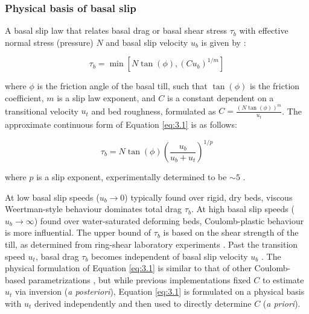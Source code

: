 \subsubsection{Physical basis of basal slip}

A basal slip law that relates basal drag or basal shear stress $\tau_b$ with effective normal stress (pressure) $N$ and basal slip velocity $u_b$ is given by \citet[][eq.1]{Zoetsliplawglaciers2020}:

\begin{equation}
  \tau_b = \min [ N \tan(\phi), (C u_b)^{1/m} ] \label{eq:3.1}
\end{equation}

where $\phi$ is the friction angle of the basal till, such that $\tan(\phi)$ is the friction coefficient, $m$ is a slip law exponent, and $C$ is a constant dependent on a transitional velocity $u_t$ and bed roughness, formulated as $C = \frac{(N \tan(\phi))^{m}}{u_t}$.
The approximate continuous form of Equation \eqref{eq:3.1} \citep[][eq.3]{Zoetsliplawglaciers2020} is as follows:

\begin{equation}
  \tau_b = N \tan(\phi) \left( \frac{u_b}{u_b + u_t} \right)^{1/p} \label{eq:3.2}
\end{equation}

where $p$ is a slip exponent, experimentally determined to be $\sim5$ \citep{Zoetsliplawglaciers2020}.

At low basal slip speeds ($u_b \to 0$) typically found over rigid, dry beds, viscous Weertman-style behaviour \citep[$(C u_b)^{1/m}$ in Eq.~\ref{eq:3.1},][]{WeertmanSlidingGlaciers1957} dominates total drag $\tau_b$.
At high basal slip speeds ($u_b \to \infty$) found over water-saturated deforming beds, Coulomb-plastic behaviour \citep[$N \tan(\phi)$ in Eq.~\ref{eq:3.1}, e.g.][]{Schoofeffectcavitationglacier2005,JoughinRegularizedCoulombFriction2019} is more influential.
The upper bound of $\tau_b$ is based on the shear strength of the till, as determined from ring-shear laboratory experiments \citep{Zoetsliplawglaciers2020}.
Past the transition speed $u_t$, basal drag $\tau_b$ becomes independent of basal slip velocity $u_b$ \citep[c.f.][]{StearnsFrictionbeddoes2018}.
The physical formulation of Equation \eqref{eq:3.1} is similar to that of other Coulomb-based parametrizations \citep[e.g.][]{TsaiMarineicesheetprofiles2015,JoughinRegularizedCoulombFriction2019}, but while previous implementations fixed $C$ to estimate $u_t$ via inversion (\textit{a posteriori}), Equation \eqref{eq:3.1} is formulated on a physical basis with $u_t$ derived independently \citep[using clast size and till placement, see eq.2 in][]{Zoetsliplawglaciers2020} and then used to directly determine $C$ (\textit{a priori}).


